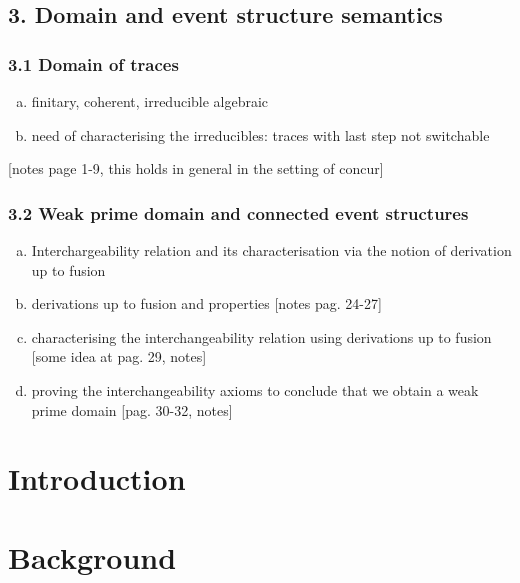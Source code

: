 \documentclass[a4paper,UKenglish,cleveref,pdftex,thm-restate,numberwithinsect]{lipics-v2021}
\begin{document}
\subsection*{3. Domain and event structure semantics}

\subsubsection*{3.1 Domain of traces}

\begin{enumerate}[a.]
  
\item  finitary, coherent, irreducible algebraic

\item need of characterising the  irreducibles: traces with last step not switchable
\end{enumerate}

[notes page 1-9, this holds in general in the setting of concur]

\subsubsection*{3.2 Weak prime domain and connected event structures}

\begin{enumerate}[a.]
  
\item Interchargeability relation and its characterisation via the notion
  of derivation up to fusion

\item derivations up to fusion and properties [notes pag. 24-27]

\item characterising the interchangeability relation using
derivations up to fusion [some idea at pag. 29, notes]

\item  proving the interchangeability axioms to conclude that we
obtain a weak prime domain [pag. 30-32, notes]
\end{enumerate}

\section{Introduction}


\section{Background}
\label{sec:back}
\end{document}
